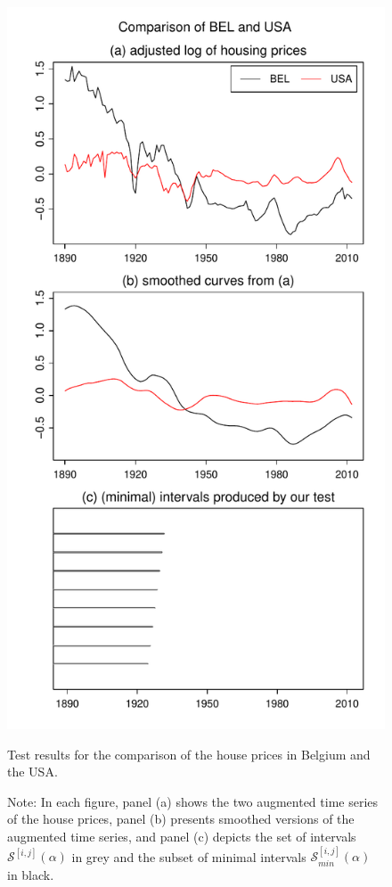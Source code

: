 \documentclass[12pt]{article}
\begin{document}
\begin{figure}
\hspace{0.1cm}
\begin{minipage}[t]{0.24\textwidth}
\includegraphics[width=\textwidth]{output/plots/hp/BEL_vs_USA}
\caption{Test results for the comparison of the house prices in Belgium and the USA.}\label{fig:hp:Belgium:USA}
\end{minipage}
\caption*{Note: In each figure, panel (a) shows the two augmented time series of the house prices, panel (b) presents smoothed versions of the augmented time series, and panel (c) depicts the set of intervals $\mathcal{S}^{[i, j]}(\alpha)$ in grey and the subset of minimal intervals $\mathcal{S}^{[i, j]}_{min}(\alpha)$ in black.}
\end{figure}
\end{document}
